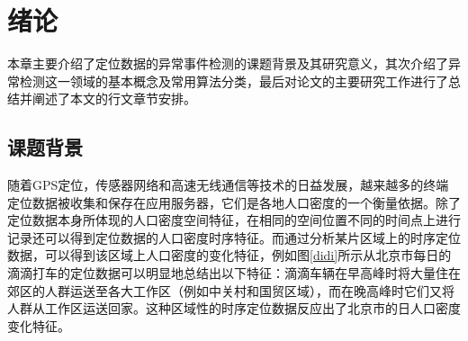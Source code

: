 \documentclass[a4paper,AutoFakeBold,oneside,12pt]{book}
\begin{document}
  
\newpage

  
\newpage

  
\newpage

 
\newpage

\frontmatter\tableofcontents %

\newpage\mainmatter
{} %
\pagestyle{fancy} %


\chapter{绪论}


本章主要介绍了定位数据的异常事件检测的课题背景及其研究意义，其次介绍了异常检测这一领域的基本概念及常用算法分类，最后对论文的主要研究工作进行了总结并阐述了本文的行文章节安排。

\section{课题背景}

随着GPS定位，传感器网络和高速无线通信等技术的日益发展，越来越多的终端定位数据被收集和保存在应用服务器，它们是各地人口密度的一个衡量依据。除了定位数据本身所体现的人口密度空间特征，在相同的空间位置不同的时间点上进行记录还可以得到定位数据的人口密度时序特征。而通过分析某片区域上的时序定位数据，可以得到该区域上人口密度的变化特征\cite{陈佳2014利用手机定位数据的用户特征挖掘}，例如图\ref{didi}所示从北京市每日的滴滴打车的定位数据可以明显地总结出以下特征：滴滴车辆在早高峰时将大量住在郊区的人群运送至各大工作区（例如中关村和国贸区域），而在晚高峰时它们又将人群从工作区运送回家。这种区域性的时序定位数据反应出了北京市的日人口密度变化特征。
\end{document}
